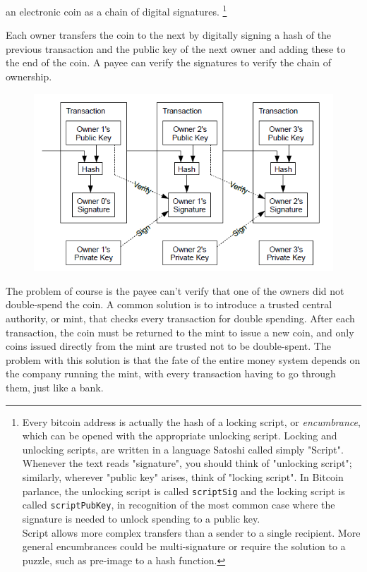 \documentclass[nohyper]{tufte-handout}
\begin{document}
 an electronic coin as a chain of digital signatures.
\footnote{
Every bitcoin address is actually the hash of a locking script, or \emph{encumbrance}, which can be opened with the appropriate unlocking script.   Locking and unlocking scripts, are written in a language Satoshi called simply "Script".\\
Whenever the text reads "signature", you should think of "unlocking script"; similarly, wherever "public key" arises, think of "locking script".  In Bitcoin parlance, the unlocking script is called \texttt{scriptSig} and the locking script is called \texttt{scriptPubKey}, in recognition of the most common case where the signature is needed to unlock spending to a public key.\\
Script allows more complex transfers than a sender to a single recipient.  More general encumbrances could be multi-signature or require the solution to a puzzle, such as pre-image to a hash function.
}

Each owner transfers the coin to the next by digitally signing a hash of the
previous transaction and the public key of the next owner and adding
these to the end of the coin. A payee can verify the signatures to
verify the chain of ownership.

\begin{figure}[!h]
\centering
\includegraphics[width=0.75\linewidth]{transactions.png}
\end{figure}

The problem of course is the payee can't verify that one of the owners did not double-spend the coin. A common solution is to introduce a trusted central authority, or mint, that checks every transaction for double spending. After each transaction, the coin must be returned to the mint to issue a new coin, and only coins issued directly from the mint are trusted not to be double-spent. The problem with this solution is that the fate of the entire money system depends on the company running the mint, with every transaction having to go through them, just like a bank.
\end{document}
